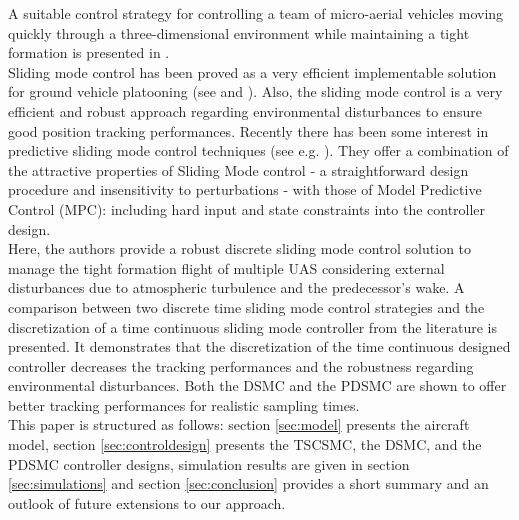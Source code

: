 \documentclass{ifacconf}
\begin{document}
A suitable control strategy for  controlling a team of micro-aerial vehicles moving quickly through a three-dimensional environment while maintaining a tight formation is presented in \cite{turpin2012trajectory}. \\
Sliding mode control has been proved as a very efficient implementable solution for ground vehicle platooning (see \cite{ferrara2008sliding} and \cite{zou2013distributed}). Also, the sliding mode control is a very efficient and robust approach regarding environmental disturbances to ensure good position tracking performances. 
Recently there has been some interest in predictive sliding mode control techniques (see e.g. \cite{perez2010robust,houda2013new}). They offer a combination of the attractive properties of Sliding Mode control - a straightforward design procedure and insensitivity to perturbations - with those of Model Predictive Control (MPC): including hard input and state constraints into the controller design.\\
Here, the authors provide a robust discrete sliding mode control solution to manage the tight formation flight of multiple UAS considering external disturbances due to atmospheric turbulence and the predecessor's wake. A comparison between two discrete time sliding mode control strategies  and the discretization of a time continuous sliding mode controller from the literature is presented. It demonstrates that the discretization of the time continuous designed controller decreases the tracking performances and the robustness regarding environmental disturbances.
Both the DSMC and the PDSMC are shown to offer better tracking performances for realistic sampling times.\\
This paper is structured as follows: section \ref{sec:model} presents the aircraft model, section \ref{sec:controldesign} presents the TSCSMC, the DSMC, and the PDSMC controller designs, simulation results are given in section \ref{sec:simulations} and section \ref{sec:conclusion} provides a short summary and an outlook of future extensions to our approach.
\end{document}
